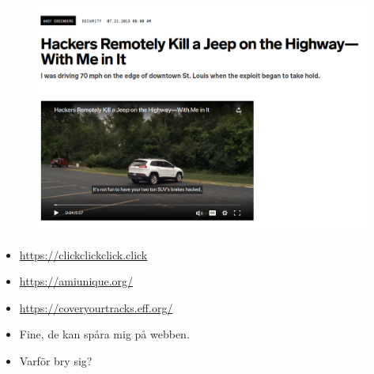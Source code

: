 \begin{frame}
  \begin{figure}
    \includegraphics[width=\columnwidth]{fig/hacking-jeep.png}
  \end{figure}
\end{frame}

\begin{frame}
  \begin{example}
    \begin{itemize}
      \item \url{https://clickclickclick.click}
      \item \url{https://amiunique.org/}
      \item \url{https://coveryourtracks.eff.org/}
    \end{itemize}
  \end{example}
\end{frame}

\begin{frame}
  \begin{question}
    \begin{itemize}
      \item Fine, de kan spåra mig på webben.
      \item Varför bry sig?
    \end{itemize}
  \end{question}
\end{frame}

